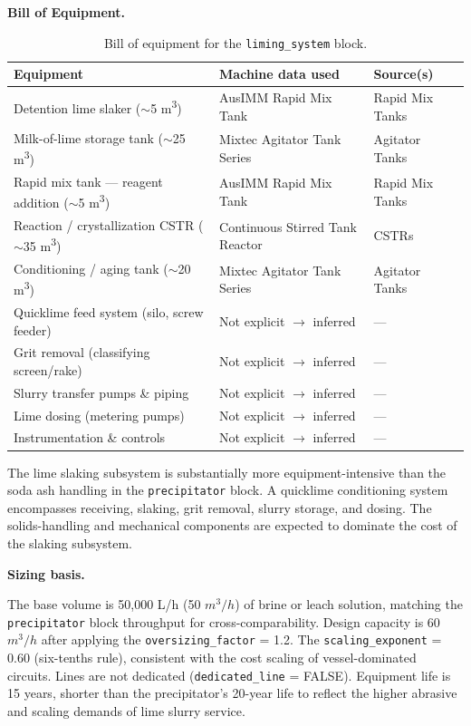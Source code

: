 \medskip
\noindent\textbf{Bill of Equipment.}\quad
\begin{table}[h!]
\caption{Bill of equipment for the \texttt{liming\_system} block.}
\centering
\begin{tabular}{>{\raggedright\arraybackslash}p{5.2cm}
				>{\raggedright\arraybackslash}p{4cm}
				>{\raggedright\arraybackslash}p{4.5cm}}
\toprule
\textbf{Equipment} & \textbf{Machine data used} & \textbf{Source(s)} \\
\midrule
Detention lime slaker ($\sim$5 \si{m^3}) & AusIMM Rapid Mix Tank & Rapid Mix Tanks \\
Milk-of-lime storage tank ($\sim$25 \si{m^3}) & Mixtec Agitator Tank Series & Agitator Tanks \\
Rapid mix tank --- reagent addition ($\sim$5 \si{m^3}) & AusIMM Rapid Mix Tank & Rapid Mix Tanks \\
Reaction / crystallization CSTR ($\sim$35 \si{m^3}) & Continuous Stirred Tank Reactor & CSTRs \\
Conditioning / aging tank ($\sim$20 \si{m^3}) & Mixtec Agitator Tank Series & Agitator Tanks \\
Quicklime feed system (silo, screw feeder) & Not explicit $\rightarrow$ inferred & --- \\
Grit removal (classifying screen/rake) & Not explicit $\rightarrow$ inferred & --- \\
Slurry transfer pumps \& piping & Not explicit $\rightarrow$ inferred & --- \\
Lime dosing (metering pumps) & Not explicit $\rightarrow$ inferred & --- \\
Instrumentation \& controls & Not explicit $\rightarrow$ inferred & --- \\
\bottomrule
\end{tabular}
\end{table}

The lime slaking subsystem is substantially more equipment-intensive than the soda ash handling in the \texttt{precipitator} block. A quicklime conditioning system encompasses receiving, slaking, grit removal, slurry storage, and dosing. The solids-handling and mechanical components are expected to dominate the cost of the slaking subsystem.

\medskip
\noindent\textbf{Sizing basis.}\quad

The base volume is 50,000 L/h (50 $\si{m^3/h}$) of brine or leach solution, matching the \texttt{precipitator} block throughput for cross-comparability. Design capacity is 60 $\si{m^3/h}$ after applying the \texttt{oversizing\_factor} = 1.2. The \texttt{scaling\_exponent} = 0.60 (six-tenths rule), consistent with the cost scaling of vessel-dominated circuits. Lines are not dedicated (\texttt{dedicated\_line} = FALSE). Equipment life is 15 years, shorter than the precipitator's 20-year life to reflect the higher abrasive and scaling demands of lime slurry service.

